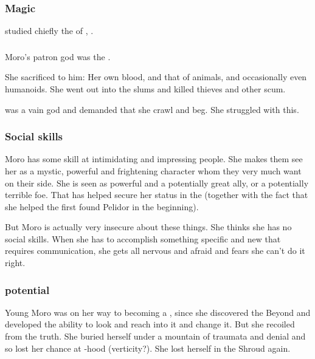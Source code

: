 \subsubsection{Magic}
\MoroCobrel studied chiefly the \arcanum of \Nasshikerr, . 





\subsubsection{\Nasshikerr}
Moro's patron god was the \Taortha {}. 

She sacrificed to him: 
Her own blood, and that of animals, and occasionally even humanoids. 
She went out into the slums and killed thieves and other scum. 

\Nasshikerr{} was a vain god and demanded that she crawl and beg. 
She struggled with this. 





\subsubsection{Social skills}
Moro has some skill at intimidating and impressing people. 
She makes them see her as a mystic, powerful and frightening character whom they very much want on their side. 
She is seen as powerful and a potentially great ally, or a potentially terrible foe. 
That has helped secure her status in the \ishrah{} (together with the fact that she helped the first \rayuths found Pelidor in the beginning). 

But Moro is actually very insecure about these things. 
She thinks she has no social skills. 
When she has to accomplish something specific and new that requires communication, she gets all nervous and afraid and fears she can't do it right. 





\subsubsection{\Vertex{} potential}
Young Moro was on her way to becoming a \vertex, since she discovered the Beyond and developed the ability to look and reach into it and change it. 
But she recoiled from the truth. 
She buried herself under a mountain of traumata and denial and so lost her chance at \vertex-hood (verticity?). 
She lost herself in the Shroud again. 


